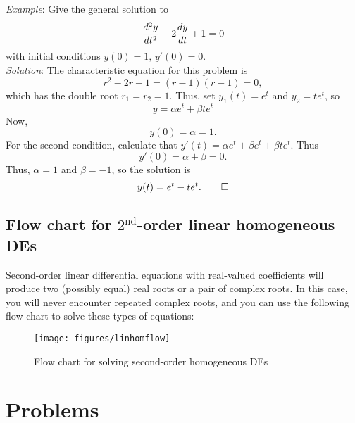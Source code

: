 \documentclass[10pt,driverfallback=hypertex]{report}
\begin{document}
\noindent\emph{Example}: Give the general solution to
\begin{dmath*}
  \ddtwo{y}{t} - 2 \dd{y}{t}+1 =0
\end{dmath*}
with initial conditions $y(0) =1, \, y'(0) =0.$\\
\noindent\emph{Solution}:
The characteristic equation for this problem is
\begin{dmath*}
  r^2 - 2r +1 = (r-1)(r-1) =0,
\end{dmath*}
which has the double root $r_1=r_2=1$. Thus, set
$y_1(t) = e^t$ and $y_2=t e^t$, so
\begin{dmath*}
  y = \alpha e^t + \beta t e^t
\end{dmath*}
Now,
\begin{dmath*}[compact]
  y(0) = \alpha = 1.
\end{dmath*}
For the second condition, calculate that
$y'(t) = \alpha e^t + \beta e^t + \beta te^t$. Thus
\begin{dmath*}[compact]
  y'(0) = \alpha + \beta =0.
\end{dmath*}
Thus, $\alpha=1$ and $\beta =-1$, so the solution is
\begin{dmath*}[compact]
  y(t) = e^t - te^t. \qed
\end{dmath*}

\newpage
\subsection{Flow chart for $2^{\text{nd}}$-order linear homogeneous DEs}

Second-order linear differential equations with real-valued
coefficients will produce two (possibly equal) real roots or a pair of
complex roots.  In this case, you will never encounter repeated
complex roots, and you can use the following flow-chart to solve these
types of equations:

\vspace{0.5in}
\begin{figure}[h]
  \centering
  \texttt{[image: figures/linhomflow]}
  \caption{Flow chart for solving second-order homogeneous DEs}
  \label{fig:linhomflow}
\end{figure}



\section{Problems}
\end{document}
